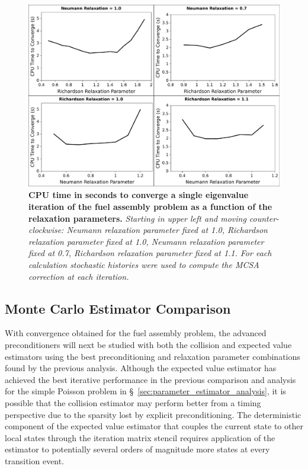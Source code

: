 \begin{figure}[t!]
  \begin{center}
    \includegraphics[width=6in]{chapters/spn_equations/relax_time.pdf}
  \end{center}
  \caption{\textbf{CPU time in seconds to converge a single eigenvalue
      iteration of the fuel assembly problem as a function of the
      relaxation parameters.} \textit{Starting in upper left and
      moving counter-clockwise: Neumann relaxation parameter fixed at
      1.0, Richardson relaxation parameter fixed at 1.0, Neumann
      relaxation parameter fixed at 0.7, Richardson relaxation
      parameter fixed at 1.1. For each calculation 
      stochastic histories were used to compute the MCSA correction at
      each iteration.}}
  \label{fig:relax_time}
\end{figure}

\clearpage

\subsection{Monte Carlo Estimator Comparison}
\label{subsec:spn_estimator_comparison}
With convergence obtained for the fuel assembly problem, the advanced
preconditioners will next be studied with both the collision and
expected value estimators using the best preconditioning and
relaxation parameter combinations found by the previous
analysis. Although the expected value estimator has achieved the best
iterative performance in the previous comparison and analysis for the
simple Poisson problem in \S~\ref{sec:parameter_estimator_analysis},
it is possible that the collision estimator may perform better from a
timing perspective due to the sparsity lost by explicit
preconditioning. The deterministic component of the expected value
estimator that couples the current state to other local states through
the iteration matrix stencil requires application of the estimator to
potentially several orders of magnitude more states at every
transition event.


